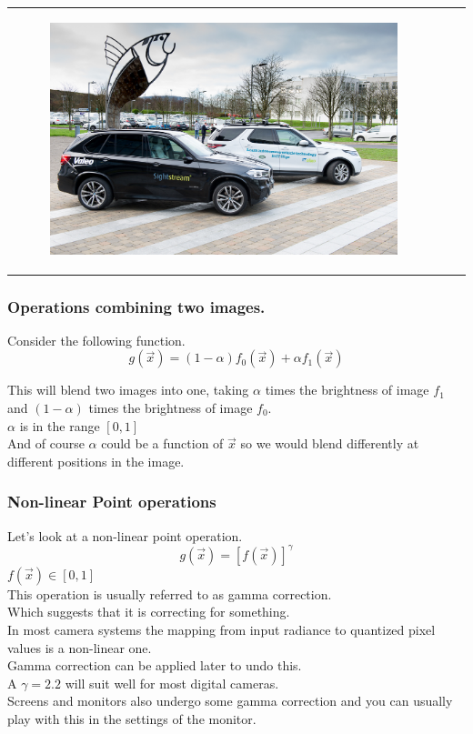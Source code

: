 \begin{frame}
\begin{tabular}{ccc}
\begin{minipage}{0.3\textwidth}
            \begin{figure}[H]

	    \includegraphics[width=\textwidth]{images/DSC_0636-2.jpg}
	     \end{figure}
        \end{minipage}\\
    \end{tabular}
\end{frame}


\begin{frame}\frametitle{Operations combining two images.}

Consider the following function.
\begin{equation}
    g(\vec{x}) = (1-\alpha)f_0(\vec{x}) + \alpha f_1(\vec{x})
\end{equation}

This will blend two images into one, taking $\alpha$ times the brightness of image $f_1$ and $(1-\alpha)$ times the brightness of image $f_0$. \\$\alpha$ is in the range $[0,1]$ \\
And of course $\alpha$ could be a function of $\vec{x}$ so we would blend differently at different positions in the image.\\
\end{frame}
\begin{frame}\frametitle{Non-linear Point operations}
Let's look at a non-linear point operation.
\begin{equation}
    g(\vec{x}) = [f(\vec{x})]^{\gamma} 
\end{equation}
$f(\vec{x})\in[0,1]$\\
This operation is usually referred to as gamma correction.\\ Which suggests that it is correcting for something.\\ In most camera systems the mapping from input radiance to quantized pixel values is a non-linear one.\\ Gamma correction can be applied later to undo this.\\ A $\gamma = 2.2$ will suit well for most digital cameras.\\ Screens and monitors also undergo some gamma correction and you can usually play with this in the settings of the monitor.
\end{frame}

